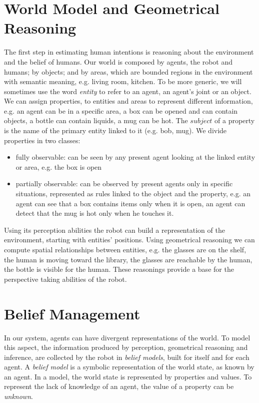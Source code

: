 \section{World Model and Geometrical Reasoning}
\label{sec:situation_assessment-situation_assessment}
The first step in estimating human intentions is reasoning about the environment and the belief of humans. Our world is composed by agents, the robot and humans; by objects; and by areas, which are bounded regions in the environment with semantic meaning, e.g. living room, kitchen. To be more generic, we will sometimes use the word \textit{entity} to refer to an agent, an agent's joint or an object. We can assign properties, to entities and areas to represent different information, e.g. 
an agent can be in a specific area, a box can be opened and can contain objects, a bottle can contain liquids, a mug can be hot. The $subject$ of a property is the name of the primary entity linked to it (e.g. bob, mug). 
 We divide properties in two classes: 
\begin{itemize}
\item fully observable:  can be seen by any present agent looking at the linked entity or area, e.g. the box is open
\item partially observable: can be observed by present agents only in specific situations, represented as rules linked to the object and the property, e.g. an agent can see that a box contains items only when it is open, an agent can detect that the mug is hot only when he touches it.
\end{itemize}

Using its perception abilities the robot can build a representation of the environment, starting with entities' positions. Using geometrical reasoning we can compute spatial relationships between entities, e.g. the glasses are on the shelf, the human is moving toward the library, the glasses are reachable by the human, the bottle is visible for the human. These reasonings provide a base for the perspective taking abilities of the robot. 


\section{Belief Management}
\label{sec:situation_assessment-belief_management}
In our system, agents can have divergent representations of the world. To model this aspect, the information produced by perception, geometrical reasoning and inference, are collected by the robot in \textit{belief models}, built for itself and for each agent. A \textit{belief model} is a symbolic representation of the world state, as known by an agent. In a model, the world state is represented by properties and values. To represent the lack of knowledge of an agent, the value of a property can be \textit{unknown}.

